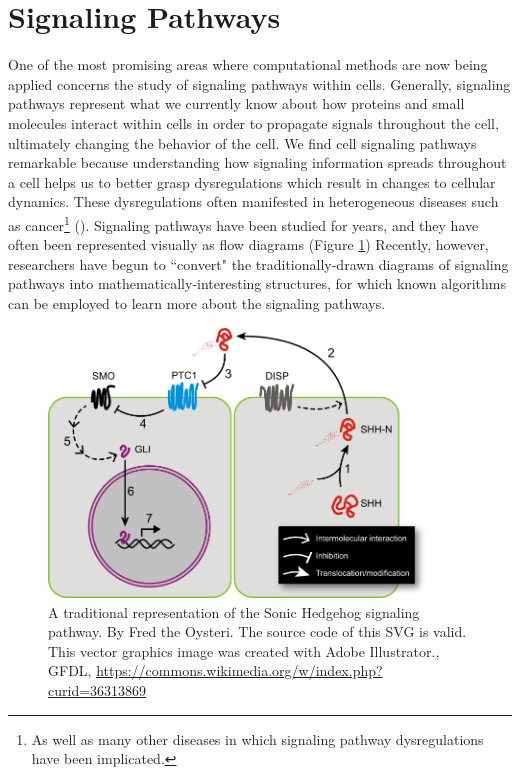 \documentclass[12pt,twoside]{reedthesis}
\theoremstyle{definition}
\begin{document}
 \section{Signaling Pathways}

 One of the most promising areas where computational methods are now being applied concerns the study of signaling pathways within cells. Generally, signaling pathways represent what we currently know about how proteins and small molecules interact within cells in order to propagate signals throughout the cell, ultimately changing the behavior of the cell. We find cell signaling pathways remarkable because understanding how signaling information spreads throughout a cell helps us to better grasp dysregulations which result in changes to cellular dynamics. These dysregulations often manifested in heterogeneous diseases such as cancer\footnote{As well as many other diseases in which signaling pathway dysregulations have been implicated.} (\cite{Taylor2009}). Signaling pathways have been studied for years, and they have often been represented visually as flow diagrams (Figure \ref{fig:shh}) Recently, however, researchers have begun to ``convert" the traditionally-drawn diagrams of signaling pathways into mathematically-interesting structures, for which known algorithms can be employed to learn more about the signaling pathways.\par

 \begin{figure}[!h]
   \begin{center}
     \includegraphics[width=4in]{Sonic_hedgehog_pathway}
   \caption[Sonic hedgehog signal transduction.]{A traditional representation of the Sonic Hedgehog signaling pathway. By Fred the Oysteri. The source code of this SVG is valid. This vector graphics image was created with Adobe Illustrator., GFDL, \url{https://commons.wikimedia.org/w/index.php?curid=36313869}}
   \label{fig:shh}
   \end{center}
 \end{figure}
\end{document}
